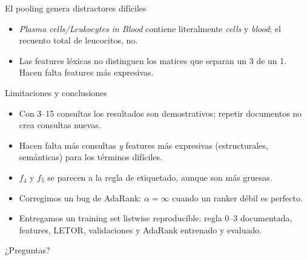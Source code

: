 \documentclass[aspectratio=169,11pt]{beamer}
\begin{document}
\begin{frame}{El pooling genera distractores difíciles}
  \centering\scriptsize
  
  \vspace{6pt}
  \begin{itemize}\small
    \item \emph{Plasma cells/Leukocytes in Blood} contiene literalmente \emph{cells} y \emph{blood}; el recuento total de leucocitos, no.
    \item Las features léxicas no distinguen los matices que separan un 3 de un 1. Hacen falta features más expresivas.
  \end{itemize}
\end{frame}

\begin{frame}{Limitaciones y conclusiones}
  \begin{itemize}
    \item Con 3--15 consultas los resultados son demostrativos; repetir documentos no crea consultas nuevas.
    \item Hacen falta más consultas \emph{y} features más expresivas (estructurales, semánticas) para los términos difíciles.
    \item $f_4$ y $f_5$ se parecen a la regla de etiquetado, aunque son más gruesas.
    \item Corregimos un bug de AdaRank: $\alpha=\infty$ cuando un ranker débil es perfecto.
    \item[$\Rightarrow$] Entregamos un training set listwise reproducible: regla 0--3 documentada, features, LETOR,
      validaciones y AdaRank entrenado y evaluado.
  \end{itemize}
\end{frame}

\begin{frame}[standout]
  ¿Preguntas?
\end{frame}
\end{document}
